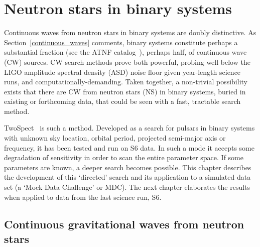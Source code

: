 


        
        \section{Neutron stars in binary systems}
        \label{binary_NS}

Continuous waves from neutron stars in binary systems are doubly distinctive.
As Section~\ref{continuous_waves} comments, binary systems constitute perhaps a substantial fraction (see the ATNF catalog~\cite{ManchesterATNF2005}), perhaps half, of continuous wave (CW) sources.
CW search methods prove both powerful, probing well below the LIGO amplitude spectral density (ASD) noise floor given year-length science runs, and computationally-demanding.
Taken together, a non-trivial possibility exists that there are CW from neutron stars (NS) in binary systems, buried in existing or forthcoming data, that could be seen with a fast, tractable search method.

TwoSpect~\cite{GoetzThesis,GoetzTwoSpectMethods2011,GoetzTwoSpectResults2014} is such a method. 
Developed as a search for pulsars in binary systems with unknown sky location, orbital period, projected semi-major axis or frequency, it has been tested and run on S6 data.
In such a mode it accepts some degradation of sensitivity in order to scan the entire parameter space.
If some parameters are known, a deeper search becomes possible.
This chapter describes the development of this `directed' search and its application to a simulated data set (a `Mock Data Challenge' or MDC).
The next chapter elaborates the results when applied to data from the last science run, S6.


\subsection{Continuous gravitational waves from neutron stars}


